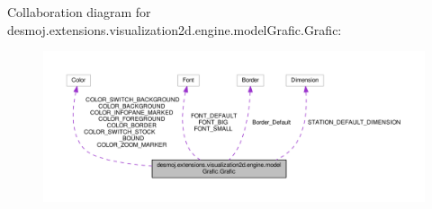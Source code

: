 Collaboration diagram for desmoj.\-extensions.\-visualization2d.\-engine.\-model\-Grafic.\-Grafic\-:
\nopagebreak
\begin{figure}[H]
\begin{center}
\leavevmode
\includegraphics[width=350pt]{interfacedesmoj_1_1extensions_1_1visualization2d_1_1engine_1_1model_grafic_1_1_grafic__coll__graph}
\end{center}
\end{figure}
